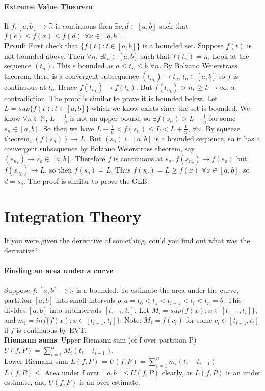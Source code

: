 \documentclass[10pt,letter]{article}
\begin{document}
\paragraph*{Extreme Value Theorem}
If $f:[a,b]\rightarrow\mathbb{R}$ is continuous then $\exists c,d \in [a,b]$ such that $f(c)\leq f(x)\leq f(d)$ $\forall x\in[a,b]$. \\ 
\textbf{Proof}: First check that $\{f(t):t\in[a,b]\}$ is a bounded set. Suppose $f(t)$ is not bounded above. Then $\forall n$, $\exists t_n\in[a,b]$ such that $f(t_n)=n$. Look at the sequence $(t_n)$. This s bounded as $a\leq t_n\leq b$ $\forall n$. By Bolzano Weierstrass theorem, there is a convergent subsequence $(t_{n_k})\rightarrow t_o$, $t_o\in[a,b]$ so $f$ is continuous at $t_o$. Hence $f(t_{n_k})\rightarrow f(t_o)$. But $f(t_{n_k})>n_k\geq k \rightarrow\infty$, a contradiction. The proof is similar to prove it is bounded below. 
Let $L = sup\{f(t):t\in[a,b]\}$ which we know exists since the set is bounded. We know $\forall n\in\mathbb{N}$, $L-\frac{1}{n}$ is not an upper bound, so $\exists f(s_n)>L-\frac{1}{n}$ for some $s_n\in[a,b]$. So then we have $L-\frac{1}{n}<f(s_n)\leq L < L + \frac{1}{n}$, $\forall n$. By squeeze theorem, $(f(s_n))\rightarrow L$. But $(s_n)\subseteq[a,b]$ is a bounded sequence, so it has a convergent subsequence by Bolzano Weierstrass theorem, say $(s_{n_k})\rightarrow s_o\in[a,b]$. Therefore $f$ is continuous at $s_o$. $f(s_{n_k})\rightarrow f(s_o)$ but $f(s_{n_k})\rightarrow L$, so then $f(s_o)=L$. Thus $f(s_o)=L\geq f(x)$ $\forall x\in[a,b]$, so $d = s_o$. The proof is similar to prove the GLB. 

\section*{Integration Theory}
If you were given the derivative of something, could you find out what was the derivative? 

\paragraph*{Finding an area under a curve}
Suppose $f:[a,b]\rightarrow\mathbb{R}$ is a bounded. To estimate the area under the curve, partition $[a,b]$ into small intervals $p:a=t_0<t_1<t_{i-1}<t_i<t_n=b$. This divides $[a,b]$ into subintervals $[t_{i-1},t_i]$. Let $M_i=sup\{f(x):x\in[t_{i-1},t_i]\}$, and $m_i=inf\{f(x):x\in[t_{i-1},t_i]\}$. Note: $M_i=f(c_i)$ for some $c_i\in[t_{i-1},t_i]$ if $f$ is continuous by EVT. \\ 
\textbf{Riemann sums}: Upper Riemann sum (of f over partition P)$U(f,P)=\sum_{i=1}^nM_i(t_i-t_{i-1})$. \\ 
Lower Riemann sum $L(f,P)$ = $U(f,P)=\sum_{i=1}^nm_i(t_i-t_{i-1})$ \\ 
$L(f,P)\leq$ Area under f over $[a,b]\leq U(f,P)$ clearly, as $L(f,P)$ is an under estimate, and $U(f,P)$ is an over estimate.
\end{document}
